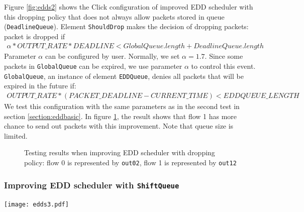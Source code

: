 \documentclass[a4paper]{article}
\begin{document}
  Figure \ref{fig:edds2} shows the Click configuration of improved EDD scheduler with this dropping policy that does not always allow packets stored in queue (\texttt{DeadlineQueue}). Element \texttt{ShouldDrop} makes the decision of dropping packets: packet is dropped if \begin{align*}\alpha * OUTPUT\_RATE * DEADLINE < GlobalQueue.length + DeadlineQueue.length\end{align*}
  	Parameter $\alpha$ can be configured by user. Normally, we set $\alpha = 1.7$. Since some packets in \texttt{GlobalQueue} can be expired, we use parameter $\alpha$ to control this event. \texttt{GlobalQueue}, an instance of element \texttt{EDDQueue}, denies all packets that will be expired in the future if:
  	\begin{align*}OUTPUT\_RATE * (PACKET\_DEADLINE - CURRENT\_TIME) < EDDQUEUE\_LENGTH\end{align*}
    We test this configuration with the same parameters as in the second test in section \ref{section:eddbasic}. In figure \ref{fig:test-edd2}, the result shows that flow 1 has more chance to send out packets with this improvement. Note that queue size is limited.
    
    \begin{figure}
      \centering
        \caption{Testing results when improving EDD scheduler with dropping policy: flow 0 is represented by \texttt{out02}, flow 1 is represented by \texttt{out12}}
        \label{fig:test-edd2}
    \end{figure}
  
  \subsubsection{Improving EDD scheduler with \texttt{ShiftQueue}} \label{section:shiftqueue}

  \begin{center}
	  \texttt{[image: edds3.pdf]}
	  \label{fig:edds3}
    \end{center}
\end{document}
